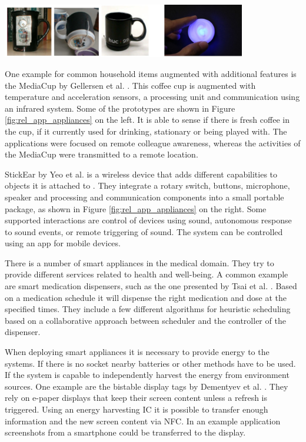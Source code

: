 \begin{minipage}{\linewidth}
\centering
\includegraphics[width=0.8\textwidth]{images/rel_app_appliances}
\label{fig:rel_app_appliances}
\end{minipage}	

One example for common household items augmented with additional features is the MediaCup by Gellersen et al. \cite{gellersen1999mediacup}. This coffee cup is augmented with temperature and acceleration sensors, a processing unit and communication using an infrared system. Some of the prototypes are shown in Figure \ref{fig:rel_app_appliances} on the left. It is able to sense if there is fresh coffee in the cup, if it currently used for drinking, stationary or being played with. The applications were focused on remote colleague awareness, whereas the activities of the MediaCup were transmitted to a remote location.

StickEar by Yeo et al. is a wireless device that adds different capabilities to objects it is attached to \cite{yeo2013stickear}. They integrate a rotary switch, buttons, microphone, speaker and processing and communication components into a small portable package, as shown in Figure \ref{fig:rel_app_appliances} on the right. Some supported interactions are control of devices using sound, autonomous response to sound events, or remote triggering of sound. The system can be controlled using an app for mobile devices.

There is a number of smart appliances in the medical domain. They try to provide different services related to health and well-being. A common example are smart medication dispensers, such as the one presented by Tsai et al. \cite{tsai2011smart}. Based on a medication schedule it will dispense the right medication and dose at the specified times. They include a few different algorithms for heuristic scheduling based on a collaborative approach between scheduler and the controller of the dispenser.

When deploying smart appliances it is necessary to provide energy to the systems. If there is no socket nearby batteries or other methods have to be used. If the system is capable to independently harvest the energy from environment sources. One example are the bistable display tags by Dementyev et al. \cite{dementyev2013wirelessly}. They rely on e-paper displays that keep their screen content unless a refresh is triggered. Using an energy harvesting IC it is possible to transfer enough information and the new screen content via NFC. In an example application screenshots from a smartphone could be transferred to the display.

